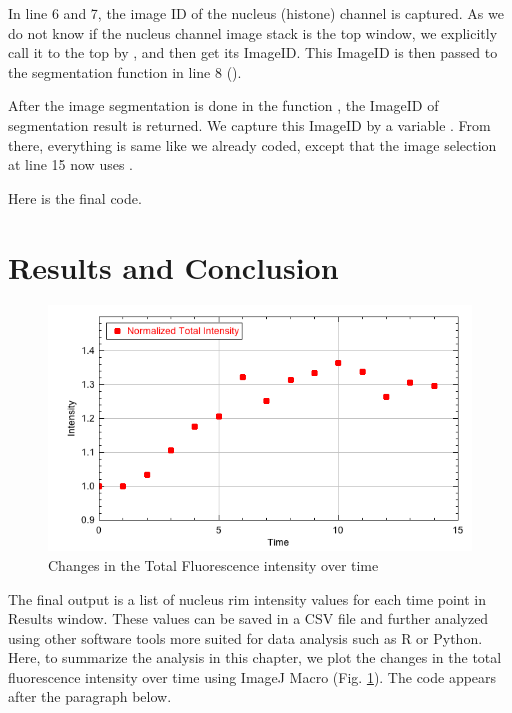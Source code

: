 In line 6 and 7, the image ID of the nucleus (histone) channel is captured. As we do not know if the nucleus channel image stack is the top window, we explicitly call it to the top by , and then get its ImageID. This ImageID  is then passed to the segmentation function in line 8 (). 

After the image segmentation is done in the function , the ImageID of segmentation result is returned. We capture this ImageID by a variable . From there, everything is same like we already coded, except that the image selection at line 15 now uses .  

Here is the final code. 

 


\section{Results and Conclusion}

\begin{figure}[h!]
\begin{center}
\includegraphics[scale=0.4]{fig/totalIntensityPlot.png}
\caption{Changes in the Total Fluorescence intensity over time}
\label{fig:FluorescenceChangeOvertime}
\end{center}
\end{figure}

The final output is a list of nucleus rim intensity values for each time point in Results window. These values can be saved in a CSV file and further analyzed using other software tools more suited for data analysis such as R or Python. Here, to summarize the analysis in this chapter, we plot the changes in the total fluorescence intensity over time using ImageJ Macro  (Fig. \ref{fig:FluorescenceChangeOvertime}). The code appears after the paragraph below. 

